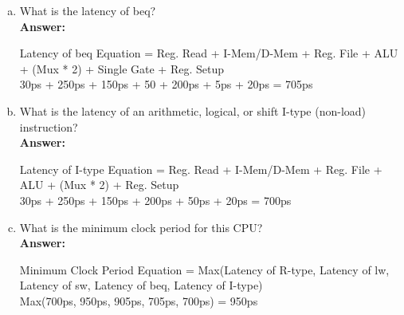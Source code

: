 \documentclass[11pt]{article}
\begin{document}
\begin{enumerate}[(a)]
    \item What is the latency of beq?\\
    \textbf{Answer:}
    \begin{center}
        Latency of beq Equation = Reg. Read + I-Mem/D-Mem + Reg. File + ALU + (Mux * 2) + Single Gate + Reg. Setup\\
        30ps + 250ps + 150ps + 50 + 200ps + 5ps + 20ps = 705ps\\
    \end{center}

    \item What is the latency of an arithmetic, logical, or shift I-type (non-load) instruction?\\
    \textbf{Answer:}
    \begin{center}
        Latency of I-type Equation = Reg. Read + I-Mem/D-Mem + Reg. File + ALU + (Mux * 2) + Reg. Setup\\
        30ps + 250ps + 150ps + 200ps + 50ps + 20ps = 700ps\\
    \end{center}

    \item What is the minimum clock period for this CPU?\\
    \textbf{Answer:}
    \begin{center}
        Minimum Clock Period Equation = Max(Latency of R-type, Latency of lw, Latency of sw, Latency of beq, Latency of I-type)\\
        Max(700ps, 950ps, 905ps, 705ps, 700ps) = 950ps\\
    \end{center}
\end{enumerate}
\end{document}
